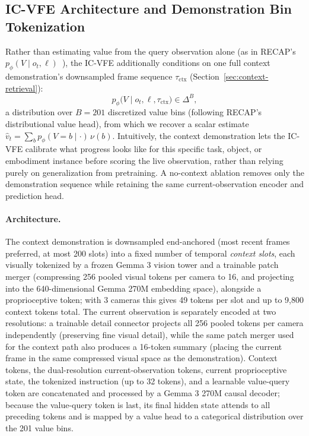 \subsection{IC-VFE Architecture and Demonstration Bin Tokenization}
\label{sec:ic-vfe-architecture}

Rather than estimating value from the query observation alone (as in RECAP's
$p_\phi(V \mid o_t, \ell)$~\cite{pi06}), the IC-VFE additionally conditions on one full
context demonstration's downsampled frame sequence $\tau_{\text{ctx}}$
(Section~\ref{sec:context-retrieval}):
\begin{equation}
    p_\phi\big(V \mid o_t, \ell, \tau_{\text{ctx}}\big) \in \Delta^B ,
    \label{eq:ic-vfe}
\end{equation}
a distribution over $B = 201$ discretized value bins (following RECAP's distributional
value head), from which we recover a scalar estimate $\hat{v}_t = \sum_b p_\phi(V = b
\mid \cdot)\, \nu(b)$. Intuitively, the context demonstration lets the IC-VFE
calibrate what progress looks like for this specific task, object, or embodiment
instance before scoring the live observation, rather than relying purely on
generalization from pretraining. A no-context ablation removes only the demonstration
sequence while retaining the same current-observation encoder and prediction head.

\paragraph{Architecture.} The context demonstration is downsampled end-anchored (most
recent frames preferred, at most 200 slots) into a fixed number of temporal
\emph{context slots}, each visually tokenized by a frozen Gemma 3 vision tower and a
trainable patch merger (compressing 256 pooled visual tokens per camera to 16, and
projecting into the 640-dimensional Gemma 270M embedding space), alongside a
proprioceptive token; with 3 cameras this gives 49 tokens per slot and up to 9{,}800
context tokens total. The current observation is separately encoded at two
resolutions: a trainable detail connector projects all 256 pooled tokens per camera
independently (preserving fine visual detail), while the same patch merger used for
the context path also produces a 16-token summary (placing the current frame in the
same compressed visual space as the demonstration). Context tokens, the dual-resolution
current-observation tokens, current proprioceptive state, the tokenized instruction
(up to 32 tokens), and a learnable value-query token are concatenated and processed by
a Gemma 3 270M causal decoder; because the value-query token is last, its final hidden
state attends to all preceding tokens and is mapped by a value head to a categorical
distribution over the 201 value bins.

